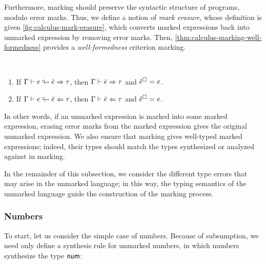 Furthermore, marking should preserve the syntactic structure of programs, modulo error marks. Thus,
we define a notion of \emph{mark erasure}, whose definition is given
\cref{fig:calculus-mark-erasure}, which converts marked expressions back into unmarked expression by
removing error marks. Then, \cref{thm:calculus-marking-well-formedness} provides a
\emph{well-formedness} criterion marking.
%
\begin{theorem}[name=Marking Well-Formedness] \
  \label{thm:calculus-marking-well-formedness}
  \begin{enumerate}
    \item If $\Gamma \vdash e \looparrowright \check{e} \Rightarrow \tau$, then $\Gamma \vdash \check{e} \Rightarrow \tau$ and
      $\check{e}^{\square} = e$.
    \item If $\Gamma \vdash e \looparrowright \check{e} \Leftarrow \tau$, then $\Gamma \vdash \check{e} \Leftarrow \tau$ and
      $\check{e}^{\square} = e$.
  \end{enumerate}
\end{theorem}
%
In other words, if an unmarked expression is marked into some marked expression, erasing error marks
from the marked expression gives the original unmarked expression. We also ensure that marking gives
well-typed marked expressions; indeed, their types should match the types synthesized or analyzed
against in marking. %



In the remainder of this subsection, we consider the different type errors that may arise in the
unmarked language; in this way, the typing semantics of the unmarked language guide the construction
of the marking process.

\subsubsection{Numbers}
\label{sec:calculus-numbers}

To start, let us consider the simple case of numbers. Because of subsumption, we need only define a
synthesis rule for unmarked numbers, in which numbers synthesize the type ${\normalfont\textsf{num}}$:
%
\begin{mathpar}
\end{mathpar}

